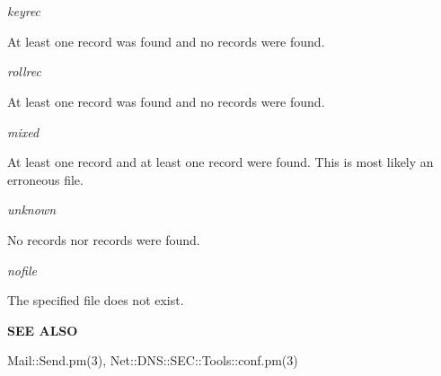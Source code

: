 \begin{description}
\begin{description}

\item {\it keyrec}\verb" "

At least one  record was found and no  records
were found.

\item {\it rollrec}\verb" "

At least one  record was found and no  records
were found.

\item {\it mixed}\verb" "

At least one  record and at least one  record
were found.  This is most likely an erroneous file.

\item {\it unknown}\verb" "

No  records nor  records were found.

\item {\it nofile}\verb" "

The specified file does not exist.

\end{description}

\end{description}

{\bf SEE ALSO}

Mail::Send.pm(3),
Net::DNS::SEC::Tools::conf.pm(3)

